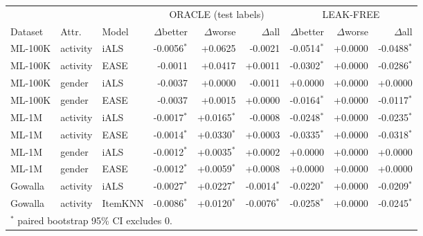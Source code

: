\begin{tabular}{lllrrrrrr}
\toprule
 & & & \multicolumn{3}{c}{ORACLE (test labels)} & \multicolumn{3}{c}{LEAK-FREE} \\
\cmidrule(lr){4-6}\cmidrule(lr){7-9}
Dataset & Attr. & Model & $\Delta$better & $\Delta$worse & $\Delta$all & $\Delta$better & $\Delta$worse & $\Delta$all \\
\midrule
ML-100K & activity & iALS & -0.0056$^{*}$ & +0.0625 & -0.0021 & -0.0514$^{*}$ & +0.0000 & -0.0488$^{*}$ \\
ML-100K & activity & EASE & -0.0011 & +0.0417 & +0.0011 & -0.0302$^{*}$ & +0.0000 & -0.0286$^{*}$ \\
ML-100K & gender & iALS & -0.0037 & +0.0000 & -0.0011 & +0.0000 & +0.0000 & +0.0000 \\
ML-100K & gender & EASE & -0.0037 & +0.0015 & +0.0000 & -0.0164$^{*}$ & +0.0000 & -0.0117$^{*}$ \\
ML-1M & activity & iALS & -0.0017$^{*}$ & +0.0165$^{*}$ & -0.0008 & -0.0248$^{*}$ & +0.0000 & -0.0235$^{*}$ \\
ML-1M & activity & EASE & -0.0014$^{*}$ & +0.0330$^{*}$ & +0.0003 & -0.0335$^{*}$ & +0.0000 & -0.0318$^{*}$ \\
ML-1M & gender & iALS & -0.0012$^{*}$ & +0.0035$^{*}$ & +0.0002 & +0.0000 & +0.0000 & +0.0000 \\
ML-1M & gender & EASE & -0.0012$^{*}$ & +0.0059$^{*}$ & +0.0008 & +0.0000 & +0.0000 & +0.0000 \\
Gowalla & activity & iALS & -0.0027$^{*}$ & +0.0227$^{*}$ & -0.0014$^{*}$ & -0.0220$^{*}$ & +0.0000 & -0.0209$^{*}$ \\
Gowalla & activity & ItemKNN & -0.0086$^{*}$ & +0.0120$^{*}$ & -0.0076$^{*}$ & -0.0258$^{*}$ & +0.0000 & -0.0245$^{*}$ \\
\bottomrule
\multicolumn{9}{l}{\footnotesize $^{*}$ paired bootstrap 95\% CI excludes 0.}\\
\end{tabular}
